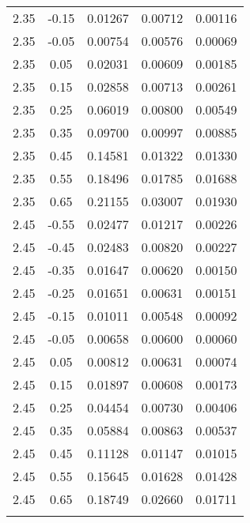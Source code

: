 \begin{longtable}{ccccc}
2.35 & -0.15 & 0.01267 & 0.00712 & 0.00116 \\ 
2.35 & -0.05 & 0.00754 & 0.00576 & 0.00069 \\ 
2.35 & 0.05 & 0.02031 & 0.00609 & 0.00185 \\ 
2.35 & 0.15 & 0.02858 & 0.00713 & 0.00261 \\ 
2.35 & 0.25 & 0.06019 & 0.00800 & 0.00549 \\ 
2.35 & 0.35 & 0.09700 & 0.00997 & 0.00885 \\ 
2.35 & 0.45 & 0.14581 & 0.01322 & 0.01330 \\ 
2.35 & 0.55 & 0.18496 & 0.01785 & 0.01688 \\ 
2.35 & 0.65 & 0.21155 & 0.03007 & 0.01930 \\ \hline
2.45 & -0.55 & 0.02477 & 0.01217 & 0.00226 \\ 
2.45 & -0.45 & 0.02483 & 0.00820 & 0.00227 \\ 
2.45 & -0.35 & 0.01647 & 0.00620 & 0.00150 \\ 
2.45 & -0.25 & 0.01651 & 0.00631 & 0.00151 \\ 
2.45 & -0.15 & 0.01011 & 0.00548 & 0.00092 \\ 
2.45 & -0.05 & 0.00658 & 0.00600 & 0.00060 \\ 
2.45 & 0.05 & 0.00812 & 0.00631 & 0.00074 \\ 
2.45 & 0.15 & 0.01897 & 0.00608 & 0.00173 \\ 
2.45 & 0.25 & 0.04454 & 0.00730 & 0.00406 \\ 
2.45 & 0.35 & 0.05884 & 0.00863 & 0.00537 \\ 
2.45 & 0.45 & 0.11128 & 0.01147 & 0.01015 \\ 
2.45 & 0.55 & 0.15645 & 0.01628 & 0.01428 \\ 
2.45 & 0.65 & 0.18749 & 0.02660 & 0.01711 \\ 
\label{tab:yields}
\end{longtable}
\clearpage


